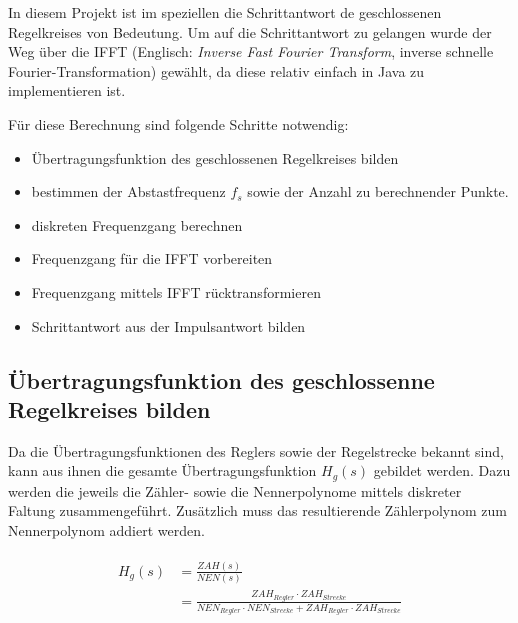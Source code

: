 In  diesem  Projekt ist  im  speziellen  die Schrittantwort  de  geschlossenen
Regelkreises von  Bedeutung. Um auf die  Schrittantwort zu gelangen  wurde der
Weg \"uber die IFFT (Englisch:  \emph{Inverse Fast Fourier Transform}, inverse
schnelle Fourier-Transformation)  gew\"ahlt, da diese relativ  einfach in Java
zu implementieren ist.

F\"ur diese Berechnung sind folgende Schritte notwendig:

\begin{itemize}
    \item
        \"Ubertragungsfunktion des geschlossenen Regelkreises bilden
    \item
        bestimmen der Abstastfrequenz $f_s$ sowie der Anzahl zu berechnender Punkte.
    \item
        diskreten Frequenzgang berechnen
    \item
        Frequenzgang f\"ur die IFFT vorbereiten
    \item
        Frequenzgang mittels IFFT r\"ucktransformieren
    \item
        Schrittantwort aus der Impulsantwort bilden
\end{itemize}


\subsection{\"Ubertragungsfunktion des geschlossenne Regelkreises bilden}

Da  die \"Ubertragungsfunktionen  des Reglers  sowie der  Regelstrecke bekannt
sind,  kann aus  ihnen  die gesamte  \"Ubertragungsfunktion $H_g(s)$  gebildet
werden. Dazu werden die jeweils die Z\"ahler- sowie die Nennerpolynome mittels
diskreter  Faltung  zusammengef\"uhrt. Zus\"atzlich   muss  das  resultierende
Z\"ahlerpolynom zum Nennerpolynom addiert werden.


\begin{gather} \label{eq:fft:hg}
    \begin{split}
        H_g(s)  & = \frac{ZAH(s)}{NEN(s)} \\
                & = \frac{ZAH_{Regler} \cdot ZAH_{Strecke}}{NEN_{Regler} \cdot NEN_{Strecke} + ZAH_{Regler} \cdot ZAH_{Strecke}}
    \end{split}
\end{gather}

